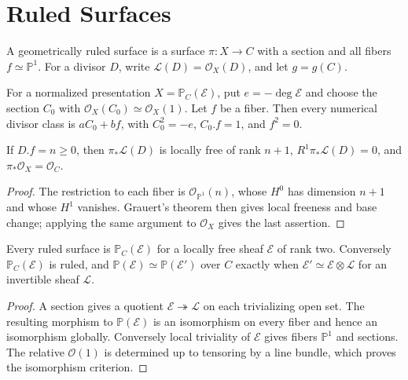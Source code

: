 \section{Ruled Surfaces}
\label{ha-v2}

\begin{definition}
A geometrically ruled surface is a surface \(\pi:X\to C\) with a section and
all fibers \(f\simeq\mathbb P^1\).  For a divisor \(D\), write
\(\mathcal L(D)=\mathcal O_X(D)\), and let \(g=g(C)\).
\end{definition}

\begin{notation}
For a normalized presentation $X=\mathbb P_C(\mathcal E)$, put
$e=-\deg\mathcal E$ and choose the section $C_0$ with
$\mathcal O_X(C_0)\simeq\mathcal O_X(1)$.  Let $f$ be a fiber.  Then every
numerical divisor class is $aC_0+bf$, with $C_0^2=-e$, $C_0.f=1$, and
$f^2=0$.
\end{notation}

\begin{lemma}
\label{ha-v2-1}
If \(D.f=n\ge0\), then \(\pi_*\mathcal L(D)\) is locally free of rank \(n+1\),
\(R^1\pi_*\mathcal L(D)=0\), and \(\pi_*\mathcal O_X=\mathcal O_C\).

\end{lemma}
\begin{proof}
The restriction to each fiber is \(\mathcal O_{\mathbb P^1}(n)\), whose
\(H^0\) has dimension \(n+1\) and whose \(H^1\) vanishes.  Grauert's theorem
then gives local freeness and base change; applying the same argument to
\(\mathcal O_X\) gives the last assertion.
\end{proof}

\begin{proposition}
\label{ha-v2-2}
Every ruled surface is \(\mathbb P_C(\mathcal E)\) for a locally free sheaf
\(\mathcal E\) of rank two.  Conversely \(\mathbb P_C(\mathcal E)\) is ruled,
and \(\mathbb P(\mathcal E)\simeq\mathbb P(\mathcal E')\) over \(C\) exactly
when \(\mathcal E'\simeq\mathcal E\otimes\mathcal L\) for an invertible sheaf
\(\mathcal L\).

\end{proposition}
\begin{proof}
A section gives a quotient \(\mathcal E\twoheadrightarrow\mathcal L\) on
each trivializing open set.  The resulting morphism to \(\mathbb P(\mathcal E)\)
is an isomorphism on every fiber and hence an isomorphism globally.  Conversely
local triviality of \(\mathcal E\) gives fibers \(\mathbb P^1\) and sections.
The relative \(\mathcal O(1)\) is determined up to tensoring by a line bundle,
which proves the isomorphism criterion.
\end{proof}

